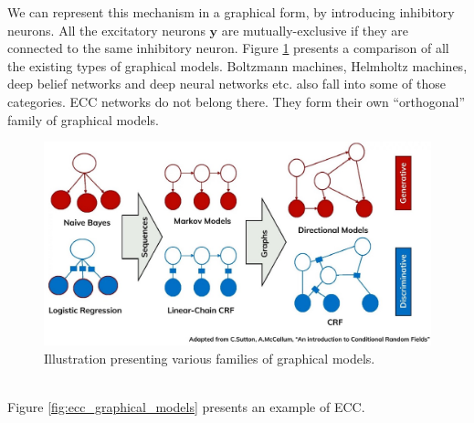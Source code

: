 \documentclass[12pt]{article}
\begin{document}
We can represent this mechanism in a graphical form, by introducing inhibitory neurons. All the excitatory neurons $\boldsymbol{y}$ are mutually-exclusive if they are connected to the same inhibitory neuron. Figure \ref{fig:graphical_models}
presents a comparison of all the existing types of graphical models. Boltzmann machines, Helmholtz machines, deep belief networks and deep neural networks etc. also fall into some of those categories. ECC networks do not belong there. They form their own ``orthogonal'' family of graphical models. 
\begin{figure}[!htbp]
	\centering
	\includegraphics[width=14cm]{crf}
	\caption{Illustration presenting various families of graphical models. }
	\label{fig:graphical_models}
\end{figure} \\
Figure \ref{fig:ecc_graphical_models} presents an example of  ECC. 
\end{document}

